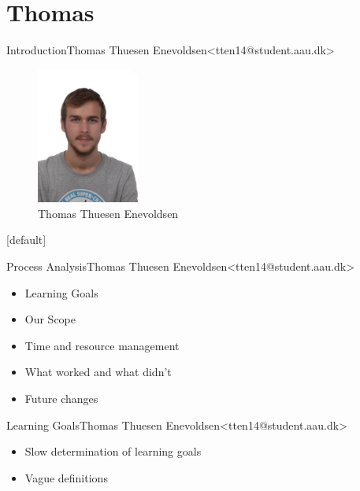 \section{Thomas}


\begin{frame}{Introduction}{Thomas Thuesen Enevoldsen\newline<tten14@student.aau.dk>}
	\begin{figure}[h!]
    	\includegraphics[width=0.3\textwidth]{images/thomas.jpg}
    	\caption{Thomas Thuesen Enevoldsen}
		\centering    		
	\end{figure}
\end{frame}

[default]

\begin{frame}{Process Analysis}{Thomas Thuesen Enevoldsen\newline<tten14@student.aau.dk>}
  \begin{itemize}
  	\item Learning Goals
  	\item Our Scope
  	\item Time and resource management
  	\item What worked and what didn't
  	\item Future changes
  \end{itemize}
\end{frame}


\begin{frame}{Learning Goals}{Thomas Thuesen Enevoldsen\newline<tten14@student.aau.dk>}
    \begin{itemize}
  	\item<2-> Slow determination of learning goals 
  	\item<3-> Vague definitions 
  \end{itemize}
\end{frame}

